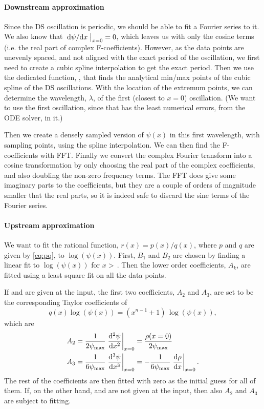 \documentclass[11pt,a4paper, 
swedish, english %
]{article}
\begin{document}
\paragraph{Downstream approximation}
Since the DS oscillation is periodic, we should be able to fit a Fourier
series to it. We also know that $\eval{\dv*{\psi}{x}}_{x=0}=0$, which
leaves us with only the cosine terms (i.e. the real part of complex
F-coefficients). However, as the data points are unevenly spaced, and
not aligned with the exact period of the oscillation, we first need to
create a cubic spline interpolation to get the exact period. Then we
use the dedicated function, , that finds the
analytical min/max points of the cubic spline of the DS
oscillations. With the location of the extremum points, we can
determine the wavelength, $\lambda$, of the first (closest to $x=0$)
oscillation. (We want to use the first oscillation, since that has the
least numerical errors, from the ODE solver, in it.)

Then we create a densely sampled version of $\psi(x)$ in this first
wavelength, with  sampling points, using the spline
interpolation. We can then find the F-coefficients with FFT. Finally
we convert the complex Fourier transform into a cosine transformation
by only choosing the real part of the complex coefficients, and also
doubling the non-zero frequency terms. The FFT does give some
imaginary parts to the coefficients, but they are a couple of orders
of magnitude smaller that the real parts, so it is indeed safe to
discard the sine terms of the Fourier series.


\paragraph{Upstream approximation}
We want to fit the rational function, $r(x)=p(x)/q(x)$, where $p$ and
$q$ are given by \eqref{eq:pq}, to $\log(\psi(x))$. First, $B_1$ and
$B_2$ are chosen by finding a linear fit to $\log(\psi(x))$ for
$x>$\,. Then the lower order coefficients, $A_k$,
are fitted using a least square fit on all the data points.

If  and  are given at the input, the first two
coefficients, $A_2$ and $A_3$, are set to be the corresponding Taylor
coefficients of
\begin{equation}
q(x)\log(\psi(x)) = (x^{n-1}+1)\,\log(\psi(x)),
\end{equation}
which are
\begin{equation}
\begin{aligned}
&A_2 = \frac{1}{2\psi_{\max}}\eval{\dv[2]{\psi}{x}}_{x=0}
= \frac{\rho(x=0)}{2\psi_{\max}}\\
&A_3 = \frac{1}{6\psi_{\max}}\eval{\dv[3]{\psi}{x}}_{x=0}
= -\frac{1}{6\psi_{\max}}\eval{\dv{\rho}{x}}_{x=0}.
\end{aligned}
\end{equation}
The rest of the coefficients are then fitted with zero as the initial
guess for all of them. If, on the other hand,  and
 are not given at the input, then also $A_2$ and $A_3$ are
subject to fitting. 
\end{document}
